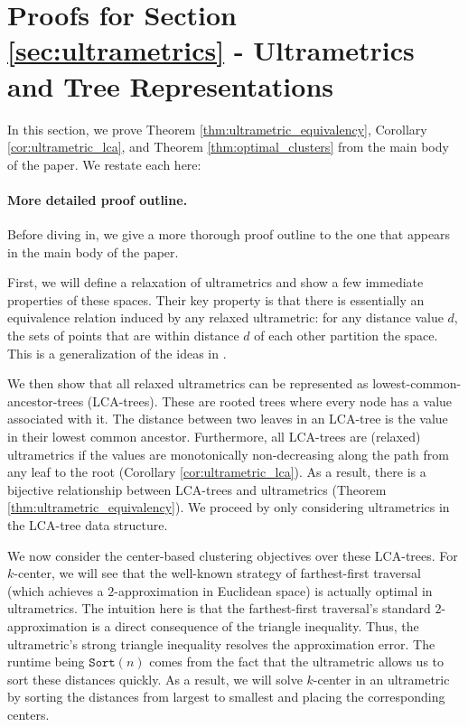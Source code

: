 \newpage
\section{Proofs for Section \ref{sec:ultrametrics} - Ultrametrics and Tree Representations}

In this section, we prove Theorem \ref{thm:ultrametric_equivalency}, Corollary \ref{cor:ultrametric_lca}, and Theorem \ref{thm:optimal_clusters} from the main body of the paper. We restate each here:

\UltrametricEquivalency*

\LCAcorollary*

\maintheorem*

\paragraph{More detailed proof outline.}

Before diving in, we give a more thorough proof outline to the one that appears in the main body of the paper.

First, we will define a relaxation of ultrametrics and show a few immediate properties of these spaces. Their key property is that there is essentially an equivalence relation induced by any relaxed ultrametric: for any distance value $d$, the sets of points that are within distance $d$ of each other partition the space. This is a generalization of the ideas in \cite{ultrametric_stability}.

We then show that all relaxed ultrametrics can be represented as lowest-common-ancestor-trees (LCA-trees). These are rooted trees where every node has a value associated with it. The distance between two leaves in an LCA-tree is the value in their lowest common ancestor. Furthermore, all LCA-trees are (relaxed) ultrametrics if the values are monotonically non-decreasing along the path from any leaf to the root (Corollary \ref{cor:ultrametric_lca}). As a result, there is a bijective relationship between LCA-trees and ultrametrics (Theorem \ref{thm:ultrametric_equivalency}). We proceed by only considering ultrametrics in the LCA-tree data structure. 

We now consider the center-based clustering objectives over these LCA-trees. For $k$-center, we will see that the well-known strategy of farthest-first traversal~\cite{Har-Peled} (which achieves a $2$-approximation in Euclidean space) is
actually optimal in ultrametrics. The intuition here is that the farthest-first traversal's standard $2$-approximation is a direct consequence of the triangle inequality.  Thus, the
ultrametric's strong triangle inequality resolves the approximation error. The runtime being $\texttt{Sort}(n)$ comes from the fact that the ultrametric allows
us to sort these distances quickly. As a result, we will solve $k$-center in an ultrametric by sorting the distances from largest to smallest and placing the
corresponding centers.

